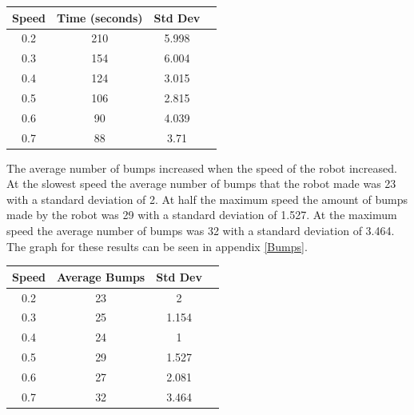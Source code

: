 \documentclass[12pt, letterpaper]{article}
\begin{document}
\begin{multicols}{2}
\begin{center}
	\begin{tabular}{ |c|c|c|c| } 
		\hline
		Speed & Time (seconds) & Std Dev \\ \hline
		0.2 & 210 & 5.998\\ \hline
		0.3 & 154 & 6.004\\ \hline
		0.4 & 124 & 3.015\\ \hline
		0.5 & 106 & 2.815\\ \hline
		0.6 & 90  & 4.039\\ \hline
		0.7 & 88  & 3.71\\ \hline
	\end{tabular}
\end{center}

The average number of bumps increased when the speed of the robot increased. At the slowest speed the average number of bumps that the robot made was 23 with a standard deviation of 2. At half the maximum speed the amount of bumps made by the robot was 29 with a standard deviation of 1.527. At the maximum speed the average number of bumps was 32 with a standard deviation of 3.464. The graph for these results can be seen in appendix \ref{Bumps}.

\begin{center}
	\begin{tabular}{ |c|c|c|c| } 
		\hline
		Speed & Average Bumps & Std Dev \\ \hline
		0.2 & 23 & 2\\ \hline
		0.3 & 25 & 1.154\\ \hline
		0.4 & 24 & 1\\ \hline
		0.5 & 29 & 1.527\\ \hline
		0.6 & 27  & 2.081\\ \hline
		0.7 & 32  & 3.464\\ \hline
	\end{tabular}
\end{center}


\end{multicols}
\end{document}

